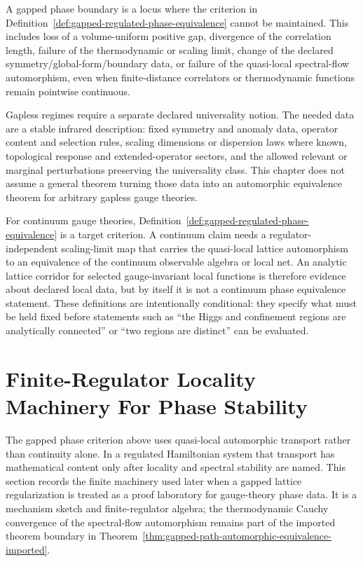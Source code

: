\begin{definition}
\label{def:phase-boundary-gapless-universality}
A gapped phase boundary is a locus where the criterion in
Definition~\ref{def:gapped-regulated-phase-equivalence} cannot be maintained.
This includes loss of a volume-uniform positive gap, divergence of the
correlation length, failure of the thermodynamic or scaling limit, change of
the declared symmetry/global-form/boundary data, or failure of the quasi-local
spectral-flow automorphism, even when finite-distance correlators or
thermodynamic functions remain pointwise continuous.

Gapless regimes require a separate declared universality notion.  The needed
data are a stable infrared description: fixed symmetry and anomaly data,
operator content and selection rules, scaling dimensions or dispersion laws
where known, topological response and extended-operator sectors, and the
allowed relevant or marginal perturbations preserving the universality class.
This chapter does not assume a general theorem turning those data into an
automorphic equivalence theorem for arbitrary gapless gauge theories.
\end{definition}

For continuum gauge theories, Definition~\ref{def:gapped-regulated-phase-equivalence}
is a target criterion.  A continuum claim needs a regulator-independent
scaling-limit map that carries the quasi-local lattice automorphism to an
equivalence of the continuum observable algebra or local net.  An analytic
lattice corridor for selected gauge-invariant local functions is therefore
evidence about declared local data, but by itself it is not a continuum phase
equivalence statement.  These definitions are intentionally conditional: they
specify what must be held fixed before statements such as ``the Higgs and
confinement regions are analytically connected'' or ``two regions are
distinct'' can be evaluated.

\section{Finite-Regulator Locality Machinery For Phase Stability}
\label{sec:finite-regulator-locality-machinery-phase-stability}

The gapped phase criterion above uses quasi-local automorphic transport rather
than continuity alone.  In a regulated Hamiltonian system that transport has
mathematical content only after locality and spectral stability are named.
This section records the finite machinery used later when a gapped lattice
regularization is treated as a proof laboratory for gauge-theory phase data.
It is a mechanism sketch and finite-regulator algebra; the thermodynamic
Cauchy convergence of the spectral-flow automorphism remains part of the
imported theorem boundary in
Theorem~\ref{thm:gapped-path-automorphic-equivalence-imported}.

